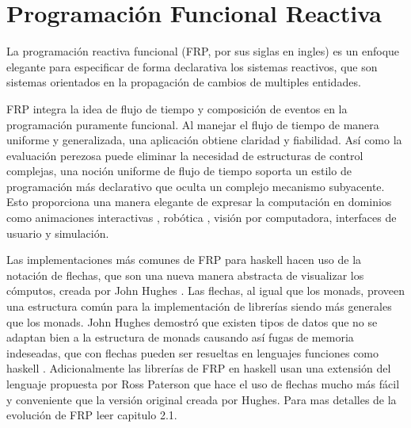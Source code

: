 
\chapter{Programación Funcional Reactiva}

\ifpdf
    \graphicspath{{Chapter2/Figs/Raster/}{Chapter2/Figs/PDF/}{Chapter2/Figs/}}
\else
    \graphicspath{{Chapter2/Figs/Vector/}{Chapter2/Figs/}}
\fi

La programación reactiva funcional (FRP, por sus siglas en ingles) es un enfoque elegante para especificar de forma declarativa los sistemas reactivos, que son sistemas orientados en la propagación de cambios de multiples entidades.

FRP integra la idea de flujo de tiempo y composición de eventos en la programación puramente funcional. Al manejar el flujo de tiempo de manera uniforme y generalizada, una aplicación obtiene claridad y fiabilidad. Así como la evaluación perezosa puede eliminar la necesidad de estructuras de control complejas, una noción uniforme de flujo de tiempo soporta un estilo de programación más declarativo que oculta un complejo mecanismo subyacente. Esto proporciona una manera elegante de expresar la computación en dominios como animaciones interactivas \cite{eh97:fran}, robótica \cite{Pembeci:2002:FRR:571157.571174}, visión por computadora, interfaces de usuario \cite{czaplicki2012elm} y simulación.

Las implementaciones más comunes de FRP para haskell  hacen uso de la notación de flechas, que son una nueva manera abstracta de visualizar los cómputos, creada por John Hughes \cite{hughes2000generalising}. Las flechas, al igual que los monads, proveen una estructura común para la implementación de librerías siendo más generales que los monads. John Hughes demostró que existen tipos de datos que no se adaptan bien a la estructura de monads causando así fugas de memoria indeseadas, que con flechas pueden ser resueltas en lenguajes funciones como haskell \cite{hughes2000generalising}. Adicionalmente las librerías de FRP en haskell usan una extensión del lenguaje propuesta por Ross  Paterson \cite{paterson2001new} que hace el uso de flechas mucho más fácil y conveniente que la versión original creada por Hughes. Para mas detalles de la evolución de FRP leer  \cite{czaplicki2012elm} capitulo 2.1.

